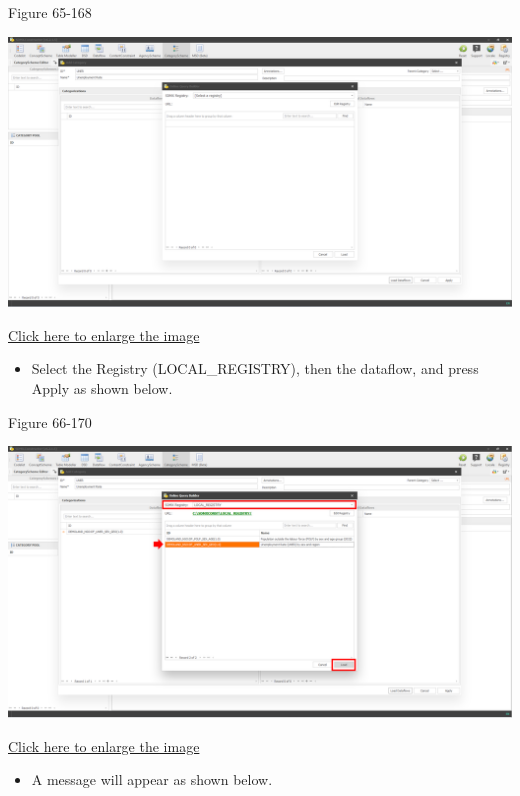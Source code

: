 \documentclass[
]{book}
\providecommand{\tightlist}{%
  \setlength{\itemsep}{0pt}\setlength{\parskip}{0pt}}
\theoremstyle{definition}
\theoremstyle{definition}
\theoremstyle{definition}
\theoremstyle{definition}
\theoremstyle{remark}
\begin{document}
Figure 65-168

\begin{center}\includegraphics[width=1\linewidth]{./images/image168} \end{center}

\href{images/image168.png}{Click here to enlarge the image}

\begin{itemize}
\tightlist
\item
  Select the Registry (LOCAL\_REGISTRY), then the dataflow, and press Apply as shown below.
\end{itemize}

Figure 66-170

\begin{center}\includegraphics[width=1\linewidth]{./images/image170} \end{center}

\href{images/image170.png}{Click here to enlarge the image}

\begin{itemize}
\tightlist
\item
  A message will appear as shown below.
\end{itemize}
\end{document}
